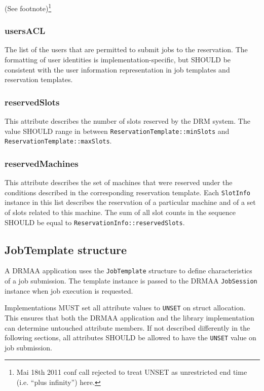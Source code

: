 \documentclass{article}
\newcommand{\h}[1]{\lstinline|#1|}
\newcommand{\rat}[1]{ {\tiny(See footnote)}\footnote{#1} }
\begin{document}
\rat{Mai 18th 2011 conf call rejected to treat UNSET as unrestricted end time (i.e. ``plus infinity'') here.}

\subsubsection{usersACL}

The list of the users that are permitted to submit jobs to the reservation. The formatting of user identities is implementation-specific, but SHOULD be consistent with the user information representation in job templates and reservation templates.

\subsubsection{reservedSlots}

This attribute describes the number of slots  reserved by the DRM system.
The value SHOULD range in between \h{ReservationTemplate::minSlots} and \h{ReservationTemplate::maxSlots}.

\subsubsection{reservedMachines}

This attribute describes the set of machines that were reserved under the conditions described in the corresponding reservation template. Each \h{SlotInfo} instance in this list describes the reservation of a particular machine and of a set of slots related to this machine. The sum of all slot counts in the sequence SHOULD be equal to \h{ReservationInfo::reservedSlots}.

\subsection{JobTemplate structure}
\label{sec:jobtemplate}

A DRMAA application uses the \h{JobTemplate} structure to define characteristics of a job submission. The template instance is passed to the DRMAA \h{JobSession} instance when job execution is requested.



Implementations MUST set all attribute values to \h{UNSET} on struct allocation. This ensures that both the DRMAA application and the library implementation can determine untouched attribute members. If not described differently in the following sections, all attributes SHOULD be allowed to have the \h{UNSET} value on job submission.  
\end{document}
